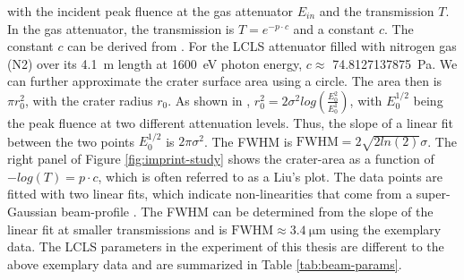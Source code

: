 with the incident peak fluence at the gas attenuator $E_{in}$ and the transmission $T$. In the gas attenuator, the transmission is $T=e^{-p \cdot c}$ and a constant $c$. The constant $c$ can be derived from \citep{Henke-1993-ADNDT}. For the LCLS attenuator filled with nitrogen gas (N2) over its \SI{4.1}{\meter} length at \SI{1600}{\electronvolt} photon energy, $c\approx$ \SI{74.8127137875}{\pascal}. We can further approximate the crater surface area using a circle. The area then is $\pi r_{0}^{2}$, with the crater radius $r_{0}$. As shown in \citep{Liu-1982-OptLett}, $r_{0}^{2}=2\sigma^{2}log(\frac{E_{0}^{2}}{E_{0}^{1}})$, with $E_{0}^{1/2}$ being the peak fluence at two different attenuation levels. Thus, the slope of a linear fit between the two points $E_{0}^{1/2}$ is $2 \pi \sigma^{2}$. The FWHM is $\text{FWHM}=2\sqrt{2 ln(2)}\sigma$. The right panel of Figure \ref{fig:imprint-study} shows the crater-area as a function of $-log(T)= p \cdot c$, which is often referred to as a Liu's plot. The data points are fitted with two linear fits, which indicate non-linearities that come from a super-Gaussian beam-profile \citep{Chalupsky-2010-OE,Chalupsky-2013-OE}. The FWHM can be determined from the slope of the linear fit at smaller transmissions and is $\text{FWHM}\approx \SI{3.4}{\micro\meter}$ using the exemplary data. The LCLS parameters in the experiment of this thesis are different to the above exemplary data and are summarized in Table \ref{tab:beam-params}.
%
%
%